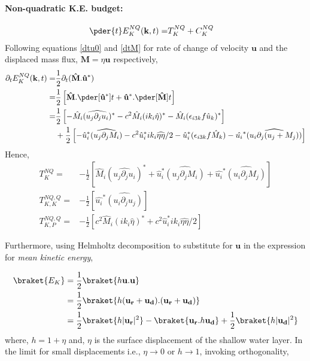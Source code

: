 \paragraph{Non-quadratic K.E. budget:}
\begin{align*}
    \pder{t}E_K^{NQ}(\mathbf{k},t) = & T_K^{NQ} + C_K^{NQ}
\end{align*}
Following equations \eqref{dtu0} and \eqref{dtM} for rate of change of velocity
$\mathbf{u}$ and the displaced mass flux, $\mathbf M = \eta \mathbf{u}$
respectively,
\begin{align*}
    \partial_t E_K^{NQ}(\mathbf{k},t)
    = & \frac{1}{2}\partial_t(\mathbf{\hat M}.\mathbf{\hat u^*})        \\
    = & \frac{1}{2}\left[ \mathbf{\hat M} .\pder[\mathbf{\hat u^*}]{t}
        + \mathbf{\hat u^*}. \pder[\mathbf{\hat M}]{t}\right]           \\
    = & \frac{1}{2}\left[-\hat{M}_i(\widehat{ u_j\partial_j u_i })^*
        - c^2 \hat{M}_i (ik_i \hat{\eta})^*
        - \hat{M}_i (\epsilon_{i3k} f \hat{u}_k)^* \right]              \\
      & +\frac{1}{2}\left[ - \hat{u}_i^* \widehat{(u_j\partial_j M_i) }
        - c^2\hat{u}_i^*ik_i\widehat{\eta\eta}/2
        - \hat{u}_i^* (\epsilon_{i3k} f \hat{M}_k)
        - \hat{u_i}^* \widehat{(u_i \partial_j({u}_j+
            M_j))}
        \right]
\end{align*}
Hence,
\begin{align}
    T_K^{NQ}=       & -\frac{1}{2}\left[\hat{M}_i(\widehat{ u_j\partial_j u_i })^*
        + \hat{u}_i^* \widehat{(u_j\partial_j M_i) }
        + \hat{u_i}^* \widehat{(u_i \partial_j{M}_j)}
        \right]                                                                    \\
    T_{K,K}^{NQ,Q}= & -\frac{1}{2}\left[ \hat{u_i}^* \widehat{(u_i
            \partial_j{u}_j)}
        \right]                                                                    \\
    T_{K,P}^{NQ,Q}= & -\frac{1}{2}\left[c^2 \hat{M}_i (ik_i \hat{\eta})^*
        + c^2\hat{u}_i^*ik_i\widehat{\eta\eta} /2
        \right]
\end{align}


Furthermore, using Helmholtz decomposition to substitute for $\mathbf u$ in
the expression
for \emph{mean kinetic energy},

\begin{align}
    \braket{ E_K}
     & = \frac{1}{2} \braket{ h\mathbf u.\mathbf u}                          \\
     & = \frac{1}{2} \braket{h(\mathbf{u_r} + \mathbf{u_d} ).(\mathbf{u_r} +
        \mathbf{u_d} )}                                                      \\
     & = \frac{1}{2}\braket{ h |\mathbf{u_r} | ^2}
    -\braket{ \mathbf{u_r}.h\mathbf{u_d}}
    +  \frac{1}{2} \braket{ h | \mathbf{u_d}| ^2}
\end{align}
where, $h = 1 + \eta$ and, $\eta$ is the surface displacement of the shallow
water layer. In the limit for small displacements i.e., $\eta \to 0$ or $ h \to
    1$, invoking orthogonality,

